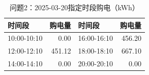\begin{table}[H]\centering\small\caption{问题2：2025-03-20指定时段购电（kWh）}\label{tab:q220250320p}
\begin{tabular}{lrlr}\toprule
时间段 & 购电量 & 时间段 & 购电量\\\midrule
10:00-10:10 & 0.00 & 16:00-16:10 & 456.20\\
12:00-12:10 & 451.12 & 18:00-18:10 & 667.10\\
14:00-14:10 & 0.00 & 20:00-20:10 & 0.00\\
\bottomrule\end{tabular}\end{table}
